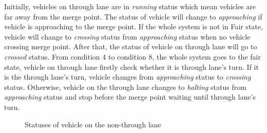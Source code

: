 \documentclass[10pt, conference, compsocconf]{IEEEtran}
\begin{document}
Initially, vehicles on through lane are in \textit{running} status which mean vehicles are far away from the merge point. 
The status of vehicle will change to \textit{approaching} if vehicle is approaching to the merge point.
If the whole system is not in Fair state, vehicle will change to \textit{crossing} status from \textit{approaching} status when no vehicle crossing merge point. 
After that, the status of vehicle on through lane will go to \textit{crossed} status. 
From condition 4 to condition 8, the whole system goes to the fair state, vehicle on through lane firstly check whether it is through lane's turn. 
If it is the through lane's turn, vehicle changes from \textit{approaching} status to \textit{crossing} status. 
Otherwise, vehicle on the through lane changes to \textit{halting} status from \textit{approaching} status and stop before the merge point waiting until through lane's turn.

\begin{figure}[h]
\begin{center}
\end{center}
\caption{Statuses of vehicle on the non-through lane}
\label{nonThroughLaneStatus}
\end{figure}
\end{document}
